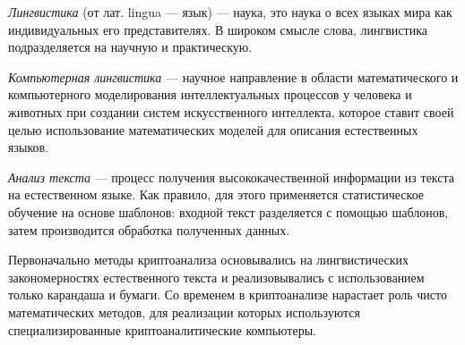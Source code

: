 \DEF\textit{Лингвистика} (от лат. lingua — язык) — наука, это наука о 
всех языках мира как индивидуальных его представителях. В широком смысле 
слова, лингвистика подразделяется на научную и практическую.

\DEF\textit{Компьютерная лингвистика} — научное направление в области математического 
и компьютерного моделирования интеллектуальных процессов у человека и животных 
при создании систем искусственного интеллекта, которое ставит своей целью 
использование математических моделей для описания естественных языков.

\DEF\textit{Анализ текста} — процесс получения высококачественной информации из текста 
на естественном языке. Как правило, для этого применяется статистическое 
обучение на основе шаблонов: входной текст разделяется с помощью шаблонов,
затем производится обработка полученных данных.

Первоначально методы криптоанализа основывались на лингвистических закономерностях 
естественного текста и реализовывались с использованием только карандаша 
и бумаги. Со временем в криптоанализе нарастает роль чисто математических 
методов, для реализации которых используются специализированные криптоаналитические 
компьютеры.

